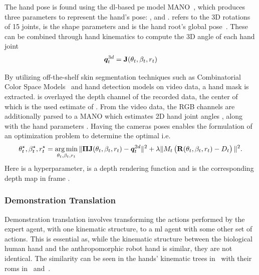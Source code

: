 The hand pose is found using the \gls{dl}-based \gls{pe} model MANO~\cite{mano}, which produces three parameters to represent the hand's pose: , and .  refers to the 3D rotations of \num{15} joints,  is the shape parameters and  is the hand root's global pose~\cite{mano}. These can be combined through hand kinematics to compute the 3D angle of each hand joint
%
\begin{equation}
    \bm{q}^{3d}_t = \bm{\mathrm{J}}(\theta_t,\beta_t,r_t)
\end{equation}

By utilizing off-the-shelf skin segmentation techniques such as Combinatorial Color Space Models~\cite{combinatorial-color-space-models-for-skin-detection-in-sub-continental-human-images} and hand detection models on video data, a hand mask  is extracted.  is overlayed the depth channel of the recorded data, the center of which is the used estimate of . From the video data, the RGB channels are additionally parsed to a MANO which estimates 2D hand joint angles , along with the hand parameters . Having the cameras poses \mat{\Pi} enables the formulation of an optimization problem to determine the optimal  i.e. 
%
\begin{equation}
    \theta_t^\star,\beta_t^\star, r_t^\star = \operatorname*{arg\,min}_{\theta_t,\beta_t,r_t} \| \bm{\mathrm{\Pi}} \bm{\mathrm{J}}(\theta_t,\beta_t, r_t) - \bm{q}_t^{2d} \|^2 + \lambda\| M_t \left( \bm{\mathrm{R}}(\theta_t,\beta_t,r_t) - D_t \right) \|^2.
\end{equation}
Here  is a hyperparameter,  is a depth rendering function and  is the corresponding depth map in frame .

\subsubsection{Demonstration Translation}

Demonstration translation involves transforming the actions performed by the expert agent, with one kinematic structure, to a \gls{ml} agent with some other set of actions. This is essential as, while the kinematic structure between the biological human hand and the anthropomorphic robot hand is similar, they are not identical. The similarity can be seen in the hands' kinematic trees in~ with their \gls{rom}s in~ and~.\medskip

